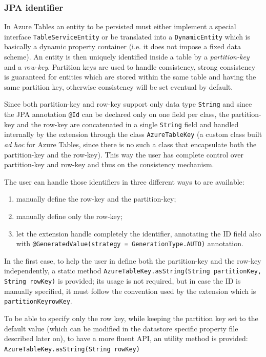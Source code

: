 \subsubsection{JPA identifier}
In Azure Tables an entity to be persisted must either implement a special interface \texttt{TableServiceEntity} or be translated into a \texttt{DynamicEntity} which is basically a dynamic property container (i.e. it does not impose a fixed data scheme).
An entity is then uniquely identified inside a table by a \textit{partition-key} and a \textit{row-key}.
\noindent Partition keys are used to handle consistency, strong consistency is guaranteed for entities which are stored within the same table and having the same partition key, otherwise consistency will be set eventual by default.

\noindent Since both partition-key and row-key support only data type \texttt{String} and since the JPA annotation \texttt{@Id} can be declared only on one field per class, the partition-key and the row-key are concatenated in a single \texttt{String} field and handled internally by the extension through the class \texttt{AzureTableKey} (a custom class built \textit{ad hoc} for Azure Tables, since there is no such a class that encapsulate both the partition-key and the row-key).
\noindent This way the user has complete control over partition-key and row-key and thus on the consistency mechanism.

\newparagraph The user can handle those identifiers in three different ways to are available:
\begin{enumerate}
\item manually define the row-key and the partition-key;
\item manually define only the row-key;
\item let the extension handle completely the identifier, annotating the ID field also with \texttt{@GeneratedValue(strategy = GenerationType.AUTO)} annotation.
\end{enumerate}

\noindent In the first case, to help the user in define both the partition-key and the row-key independently, a static method \texttt{AzureTableKey.asString(String partitionKey, String rowKey)} is provided; its usage is not required, but in case the ID is manually specified, it must follow the convention used by the extension which is \texttt{partitionKey\textunderscore rowKey}.

\noindent To be able to specify only the row key, while keeping the partition key set to the default value (which can be modified in the datastore specific property file described later on), to have a more fluent API, an utility method is provided: \texttt{AzureTableKey.asString(String rowKey)} 

